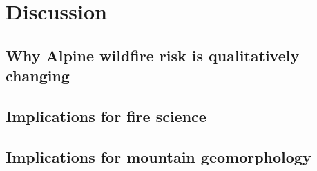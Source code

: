 \documentclass[11pt,a4paper]{article}
\begin{document}








\section{Discussion}

\subsection{Why Alpine wildfire risk is qualitatively changing}

\subsection{Implications for fire science}

\subsection{Implications for mountain geomorphology}
\end{document}
